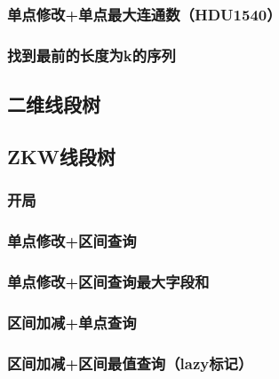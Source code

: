 \documentclass[landscape,twoside,a4paper]{article}
\begin{document}
\subsubsection{单点修改+单点最大连通数（HDU1540）}


\subsubsection{找到最前的长度为k的序列}


\subsection{二维线段树}



\subsection{ZKW线段树}

\subsubsection{开局}


\subsubsection{单点修改+区间查询}


\subsubsection{单点修改+区间查询最大字段和}


\subsubsection{区间加减+单点查询}


\subsubsection{区间加减+区间最值查询（lazy标记）}

\end{document}

